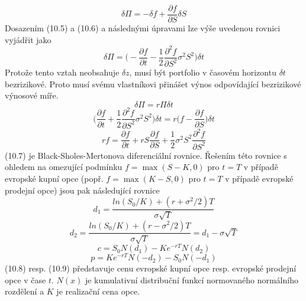 \documentclass[a4paper]{book}
\begin{document}
\begin{equation*}
\delta \Pi = -\delta f + \frac{\partial f}{\partial S}\delta S
\end{equation*}
Dosazením (10.5) a (10.6) a následnými úpravami lze výše uvedenou rovnici vyjádřit jako
\begin{equation*}
\delta \Pi = \bigg( -\frac{\partial f}{\partial t} - \frac{1}{2}\frac{\partial^2 f}{\partial S^2}\sigma^2 S^2 \bigg) \delta t
\end{equation*}
Protože tento vztah neobsahuje $\delta z$, musí být portfolio v časovém horizontu $\delta t$ bezrizikové. Proto musí svému vlastníkovi přinášet výnos odpovídající bezrizikové výnosové míře.
\begin{equation*}
\delta \Pi = r \Pi \delta t
\end{equation*}
\begin{equation*}
\bigg( \frac{\partial f}{\partial t}+\frac{1}{2}\frac{\partial^2 f}{\partial S^2}\sigma^2 S^2 \bigg) \delta t = r \bigg(f - \frac{\partial f}{\partial S} \bigg) \delta t
\end{equation*}
\begin{equation}
rf = \frac{\partial f}{\partial t}+rS \frac{\partial f}{\partial S} + \frac{1}{2} \sigma^2 S^2 \frac{\partial^2 f}{\partial S^2}
\end{equation}
(10.7) je Black-Sholes-Mertonova diferenciální rovnice. Řešením této rovnice s ohledem na omezující podmínku $f=\max(S-K,0)$ pro $t=T$ v případě evropské kupní opce (popř. $f=\max(K-S,0) $ pro $t=T$ v případě evropské prodejní opce) jsou pak následující rovnice
\begin{equation*}
d_1 = \frac{ln(S_0/K)+(r+\sigma^2/2)T}{\sigma \sqrt{T}}
\end{equation*}
\begin{equation*}
d_2 = \frac{ln(S_0/K)+(r-\sigma^2/2)T}{\sigma \sqrt{T}}=d_1 - \sigma \sqrt{T}
\end{equation*}
\begin{equation}
c = S_0 N(d_1)-Ke^{-rT}N(d_2)
\end{equation}
\begin{equation}
p = Ke^{-rT}N(-d_2)-S_0 N(-d_1)
\end{equation}
(10.8) resp. (10.9) představuje cenu evropské kupní opce  resp. evropské prodejní opce v čase $t$. $N(x)$ je kumulativní distribuční funkcí normovaného normálního rozdělení a $K$ je realizační cena opce.
\end{document}
